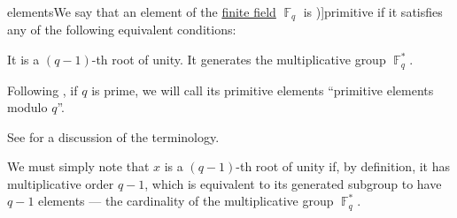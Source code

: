 \begin{definition}\label{def:finite_field_primitive_element}
elementsWe say that an element of the \hyperref[def:finite_field]{finite field} \( \BbbF_q \) is \term[en=primitive element (\cite[def. 2.9]{LidlNiederreiter1997FiniteFields})]{primitive} if it satisfies any of the following equivalent conditions:
  \begin{thmenum}
    \mimprovised It is a \( (q - 1) \)-th root of unity.
     It generates the multiplicative group \( \BbbF_q^* \).
  \end{thmenum}

  Following , if \( q \) is prime, we will call its primitive elements \enquote{primitive elements modulo \( q \)}.
\end{definition}
\begin{comments}
  \item See  for a discussion of the terminology.
\end{comments}
\begin{defproof}
   We must simply note that \( x \) is a \( (q - 1) \)-th root of unity if, by definition, it has multiplicative order \( q - 1 \), which is equivalent to its generated subgroup to have \( q - 1 \) elements --- the cardinality of the multiplicative group \( \BbbF_q^* \).
\end{defproof}

